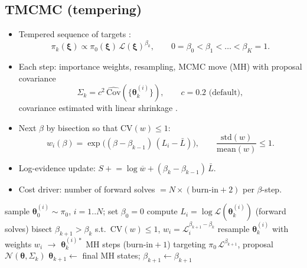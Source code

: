 \documentclass[11pt,a4paper]{article}
\newcommand{\bxi}{\boldsymbol{\xi}}          %
\newcommand{\bth}{\boldsymbol{\theta}}        %
\newcommand{\bL}{\mathcal{L}}                 %
\newcommand{\bpi}{\pi}                        %
\newcommand{\Ntot}{N}
\begin{document}
\subsection{TMCMC (tempering)}
\begin{itemize}
  \item Tempered sequence of targets \cite{chingTransitionalMarkovChain2007}:
    \begin{equation}
      \bpi_k(\bxi) \propto \bpi_0(\bxi)\,\bL(\bxi)^{\beta_k},\qquad 0 = \beta_0 < \beta_1 < \dots < \beta_K = 1.
    \end{equation}
  \item Each step: importance weights, resampling, MCMC move (MH) with proposal covariance
    \begin{equation}
      \Sigma_k = c^2\,\widehat{\mathrm{Cov}}(\{\bth_k^{(i)}\}),\qquad c = 0.2 \text{ (default)},
    \end{equation}
    covariance estimated with linear shrinkage \cite{chingTransitionalMarkovChain2007}.
  \item Next $\beta$ by bisection so that $\mathrm{CV}(w) \le 1$:
    \begin{equation}
      w_i(\beta) = \exp\big((\beta - \beta_{k-1})\,(L_i - \bar L)\big),\qquad
      \frac{\mathrm{std}(w)}{\mathrm{mean}(w)} \le 1.
    \end{equation}
  \item Log-evidence update: $S \mathrel{+}= \log\overline{w} + (\beta_k - \beta_{k-1})\,\bar L$.
  \item Cost driver: number of forward solves $= \Ntot \times (\text{burn-in} + 2)$ per $\beta$-step.
\end{itemize}

\begin{algorithm}[ht]
\caption{TMCMC (single run, fixed dimension $T$)}
\begin{algorithmic}[1]
\State sample $\bth_0^{(i)} \sim \bpi_0$, $i = 1..\Ntot$; set $\beta_0 = 0$
  \State compute $L_i = \log \bL(\bth_k^{(i)})$ (forward solves)
  \State bisect $\beta_{k+1} > \beta_k$ s.t.\ $\mathrm{CV}(w) \le 1$, $w_i = \bL_i^{\beta_{k+1}-\beta_k}$
  \State resample $\bth_k^{(i)}$ with weights $w_i$ $\rightarrow$ $\bth_k^{(i)*}$
  \State MH steps ($\text{burn-in}+1$) targeting $\bpi_0\,\bL^{\beta_{k+1}}$, proposal $\mathcal{N}(\bth, \Sigma_k)$
  \State $\bth_{k+1} \leftarrow$ final MH states; $\beta_{k+1} \leftarrow \beta_{k+1}$
\EndWhile
\end{algorithmic}
\end{algorithm}
\end{document}
